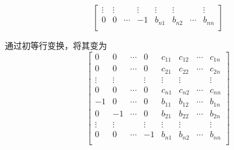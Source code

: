 \begin{itemize}
\begin{equation*}
\begin{bmatrix}
		\vdots& \vdots& & \vdots&\vdots& \vdots&        &\vdots\\
		 0& 0& \cdots& -1&b_{n1}& b_{n2}& \cdots &b_{nn}\\
	\end{bmatrix}
	\end{equation*}
	\begin{solution}
	通过初等行变换，将其变为
	\begin{equation*}
	\begin{bmatrix}
	        0 &  0 & \cdots & 0 &c_{11} &c_{12} &\cdots &c_{1n}\\
		    0 &  0 & \cdots & 0 &c_{21} &c_{22} &\cdots &c_{2n}\\
		\vdots& \vdots&        &\vdots &\vdots &\vdots & &\vdots\\
		    0 & 0& \cdots &0 &c_{n1} &c_{n2} & \cdots &c_{nn}\\
		-1& 0& \cdots& 0&b_{11}& b_{12}& \cdots &b_{1n}\\
		 0&-1& \cdots& 0&b_{21}& b_{22}& \cdots &b_{2n}\\
		\vdots& \vdots& & \vdots&\vdots& \vdots&        &\vdots\\
		 0& 0& \cdots& -1&b_{n1}& b_{n2}& \cdots &b_{nn}\\
	\end{bmatrix}
	\end{equation*}
	\end{solution}
	\vspace{4cm}
\end{itemize}

